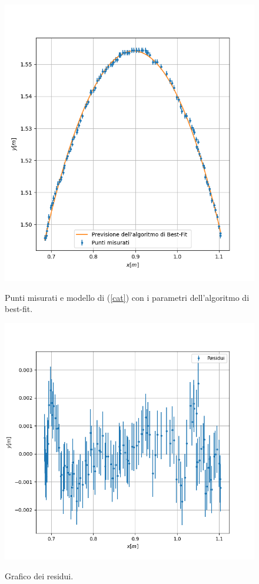 \documentclass{article}
\begin{document}
\begin{figure}
	\includegraphics[width=\textwidth]{catenaria_grafico.png}
	\label{plottinobello}
	\caption{Punti misurati e modello di (\ref{cat}) con i parametri dell'algoritmo di best-fit.}
\end{figure}

\begin{figure}
	\includegraphics[width=\textwidth]{Catenary_residuals.png}
	\label{residuiumani}
	\caption{Grafico dei residui.}
\end{figure}
\end{document}
